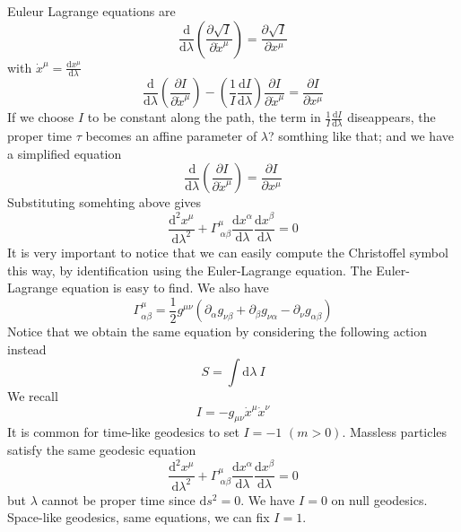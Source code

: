 \documentclass[a4paper]{book}
\theoremstyle{definition}
\theoremstyle{remark}
\begin{document}
Euleur Lagrange equations are 
\begin{equation}
    \frac{\text{d}}{\text{d}\lambda} \left(\frac{\partial \sqrt{I}}{\partial \dot{x}^\mu}\right) = \frac{\partial \sqrt{I}}{\partial x^\mu}
\end{equation}
with $\dot{x}^\mu = \frac{\text{d}x^\mu}{\text{d}\lambda}$
\begin{equation}
    \frac{\text{d}}{\text{d}\lambda} \left(\frac{\partial I}{\partial \dot{x}^\mu}\right) - \left(\frac{1}{I}\frac{\text{d}I}{\text{d}\lambda}\right)\frac{\partial I}{\partial \dot{x}^\mu} = \frac{\partial I}{\partial x^\mu}
\end{equation}
If we choose $I$ to be constant along the path, the term in $\frac{1}{I}\frac{\text{d}I}{\text{d}\lambda}$ diseappears, the proper time $\tau$ becomes an affine parameter of $\lambda$? somthing like that; and we have a simplified equation 
\begin{equation}
    \frac{\text{d}}{\text{d}\lambda}\left(\frac{\partial I}{\partial \dot{x}^\mu}\right) =  \frac{\partial I}{\partial x^\mu}
\end{equation}
Substituting somehting above gives 
\begin{equation}
    \frac{\text{d}^2x^\mu}{\text{d}\lambda^2} + \Gamma^\mu_{~\alpha\beta} \frac{\text{d}x^\alpha}{\text{d}\lambda}\frac{\text{d}x^\beta}{\text{d}\lambda} = 0
\end{equation}
It is very important to notice that we can easily compute the Christoffel symbol this way, by identification using the Euler-Lagrange equation. The Euler-Lagrange equation is easy to find. We also have 
\begin{equation}
    \Gamma^\mu_{\alpha\beta} = \frac{1}{2}g^{\mu\nu} (\partial_\alpha g_{\nu\beta} + \partial_\beta g_{\nu\alpha} - \partial_\nu g_{\alpha\beta})
\end{equation}
Notice that we obtain the same equation by considering the following action instead 
\begin{equation}
    S = \int \text{d}\lambda ~I
\end{equation}
We recall
\begin{equation}
    I = -g_{\mu\nu}\dot{x}^\mu\dot{x}^\nu 
\end{equation}
It is common for time-like geodesics to set $I = -1$ $(m>0)$. Massless particles satisfy the same geodesic equation 
\begin{equation}
    \frac{\text{d}^2x^\mu}{\text{d}\lambda^2} + \Gamma^\mu_{~\alpha\beta} \frac{\text{d}x^\alpha}{\text{d}\lambda}\frac{\text{d}x^\beta}{\text{d}\lambda} = 0
\end{equation}
but $\lambda$ cannot be proper time since $\text{d}s^2 = 0$. We have $I = 0$ on null geodesics. Space-like geodesics, same equations, we can fix $I = 1$. 
\end{document}
